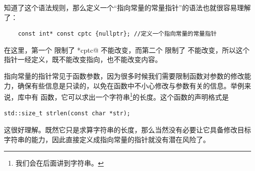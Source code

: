知道了这个语法规则，那么定义一个``指向常量的常量指针''的语法也就很容易理解了：
\begin{lstlisting}
    const int* const cptc {nullptr}; //定义一个指向常量的常量指针
\end{lstlisting}
在这里，第一个 \lstinline@const@ 限制了 \lstinline@*cptc@ 不能改变，而第二个 \lstinline@const@ 限制了 \lstinline@cptc@ 不能改变，所以这个指针一经定义，既不能改变指向，也不能改变内容。\par
指向常量的指针常见于函数参数，因为很多时候我们需要限制函数对参数的修改能力，确保有些信息是只读的，以免在函数中不小心修改与参数有关的信息。举例来说，\lstinline@cstring@ 库中有 \lstinline@strlen@ 函数，它可以求出一个字符串\footnote{我们会在后面讲到字符串。}的长度。这个函数的声明格式是
\begin{lstlisting}
std::size_t strlen(const char *str);
\end{lstlisting}
这很好理解。既然它只是求算字符串的长度，那么当然没有必要让它具备修改目标字符串的能力，因此直接定义成指向常量的指针就没有潜在风险了。\par
